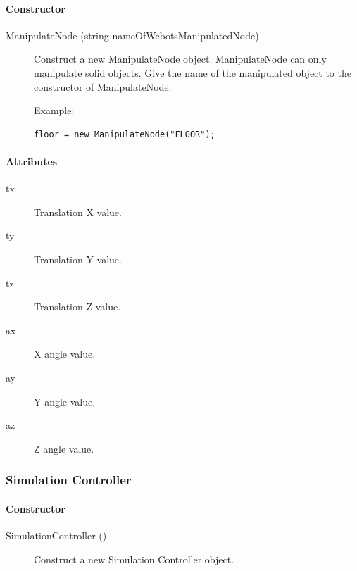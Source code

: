 \paragraph{Constructor}
\label{webots.uobjects.supervisor.manipulatenode.constructor}%

\noindent
\begin{description}
\item[{ManipulateNode (string nameOfWebotsManipulatedNode)}] Construct a new ManipulateNode object. ManipulateNode can only
          manipulate solid objects. Give the name of the manipulated object to
          the constructor of ManipulateNode.

Example:

\begin{lstlisting}
floor = new ManipulateNode("FLOOR");
\end{lstlisting}
\end{description}

\paragraph{Attributes}
\label{webots.uobjects.supervisor.manipulatenode.attributes}%

\noindent
\begin{description}
\item[{tx}] Translation X value.
\item[{ty}] Translation Y value.
\item[{tz}] Translation Z value.
\item[{ax}] X angle value.
\item[{ay}] Y angle value.
\item[{az}] Z angle value.
\end{description}

\subsubsection{Simulation Controller}
\label{webots.uobjects.supervisor.simulationcontroller}%

\paragraph{Constructor}
\label{webots.uobjects.supervisor.simulationcontroller.constructor}%

\noindent
\begin{description}
\item[{SimulationController ()}] Construct a new Simulation Controller object.

\end{description}

